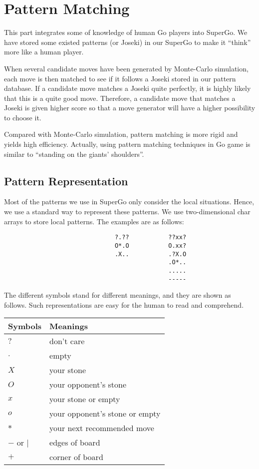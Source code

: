 \section{Pattern Matching}

This part integrates some of knowledge of human Go players into SuperGo. We have stored some existed patterns (or Joseki) in our SuperGo to make it ``think'' more like a human player. 

When several candidate moves have been generated by Monte-Carlo simulation, each move is then matched to see if it follows a Joseki stored in our pattern database. If a candidate move matches a Joseki quite perfectly, it is highly likely that this is a quite good move. Therefore, a candidate move that matches a Joseki is given higher score so that a move generator will have a higher possibility to choose it.

Compared with Monte-Carlo simulation, pattern matching is more rigid and yields high efficiency. Actually, using pattern matching techniques in Go game is similar to ``standing on the giants' shoulders''.

\subsection{Pattern Representation}

Most of the patterns we use in SuperGo only consider the local situations. Hence, we use a standard way to represent these patterns. We use two-dimensional char arrays to store local patterns. The examples are as follows:

\begin{verbatim}
                               ?.??           ??xx?
                               O*.O           O.xx?
                               .X..           .?X.O
                                              .O*..
                                              .....
                                              -----
\end{verbatim}

The different symbols stand for different meanings, and they are shown as follows. Such representations are easy for the human to read and comprehend\cite{kenchen2004gnugo}.

\begin{center}
\begin{tabular}{l|l}
\textbf{Symbols} & \textbf{Meanings} \\ \hline
$?$ & don't care \\
$.$ & empty \\
$X$ & your stone \\
$O$ & your opponent's stone \\
$x$ & your stone or empty \\
$o$ & your opponent's stone or empty \\
$*$ & your next recommended move \\
$-$ or $\mid$ & edges of board \\
$+$ & corner of board \\
\end{tabular}
\end{center}

